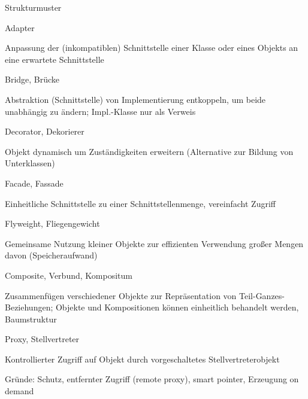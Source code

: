 \documentclass[a4paper]{article}
\begin{document}
\begin{multicols}{3}
  Strukturmuster
  \begin{itemize*}
    \item Adapter
    \begin{itemize*}
      \item Anpassung der (inkompatiblen) Schnittstelle einer Klasse oder eines Objekts an eine erwartete Schnittstelle
    \end{itemize*}
    \item Bridge, Brücke
    \begin{itemize*}
      \item Abstraktion (Schnittstelle) von Implementierung entkoppeln, um beide unabhängig zu ändern; Impl.-Klasse nur als Verweis
    \end{itemize*}
    \item Decorator, Dekorierer
    \begin{itemize*}
      \item Objekt dynamisch um Zuständigkeiten erweitern (Alternative zur Bildung von Unterklassen)
    \end{itemize*}
    \item Facade, Fassade
    \begin{itemize*}
      \item Einheitliche Schnittstelle zu einer Schnittstellenmenge, vereinfacht Zugriff
    \end{itemize*}
    \item Flyweight, Fliegengewicht
    \begin{itemize*}
      \item Gemeinsame Nutzung kleiner Objekte zur effizienten Verwendung großer Mengen davon (Speicheraufwand)
    \end{itemize*}
    \item Composite, Verbund, Kompositum
    \begin{itemize*}
      \item Zusammenfügen verschiedener Objekte zur Repräsentation von Teil-Ganzes-Beziehungen; Objekte und Kompositionen können einheitlich behandelt werden, Baumstruktur
    \end{itemize*}
    \item Proxy, Stellvertreter
    \begin{itemize*}
      \item Kontrollierter Zugriff auf Objekt durch vorgeschaltetes Stellvertreterobjekt
      \item Gründe: Schutz, entfernter Zugriff (remote proxy), smart pointer, Erzeugung on demand
    \end{itemize*}
  \end{itemize*}


\end{multicols}
\end{document}
